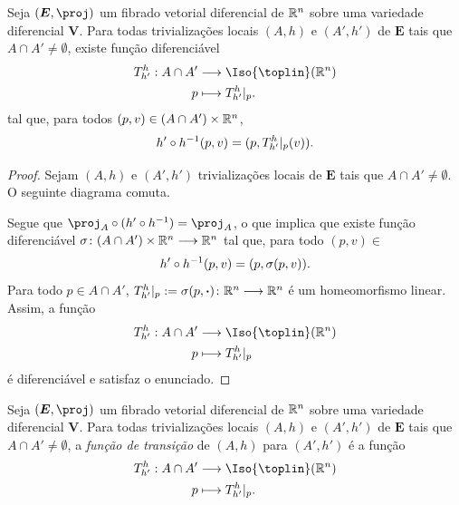 \begin{prop}
Seja $(\bm E,\proj)$ um fibrado vetorial diferencial de $\mathbb{R}^n$ sobre uma variedade diferencial $\bm V$. Para todas trivializações locais $(A,h)$ e $(A',h')$ de $\bm E$ tais que $A \cap A' \neq \emptyset$, existe função diferenciável
	\begin{align*}
	\func{T^h_{h'}}{A \cap A'}{\Iso{\toplin}(\R^n)}{p}{T^h_{h'}|_p}.
	\end{align*}
tal que, para todos $(p,v) \in (A \cap A') \times \mathbb{R}^n$,
	\begin{equation*}
	h' \circ h^{-1}(p,v) = (p,T^h_{h'}|_p (v)).
	\end{equation*}
\end{prop}
\begin{proof}
Sejam $(A,h)$ e $(A',h')$ trivializações locais de $\bm E$ tais que $A \cap A' \neq \emptyset$. O seguinte diagrama comuta.
\begin{figure}
\centering
{}
\end{figure}

Segue que $\proj_A \circ (h' \circ h\inv) = \proj_A$, o que implica que existe função diferenciável $\sigma\colon (A \cap A') \times \mathbb{R}^n \longrightarrow \mathbb{R}^n$ tal que, para todo $(p,v) \in $
	\begin{equation*}
	h' \circ h^{-1}(p,v) = (p,\sigma(p,v)).
	\end{equation*}
Para todo $p \in A \cap A'$, $T^h_{h'}|_p := \sigma(p,\bm{\cdot})\colon \mathbb{R}^n \longrightarrow \mathbb{R}^n$ é um homeomorfismo linear. Assim, a função
	\begin{align*}
	\func{T^h_{h'}}{A \cap A'}{\Iso{\toplin}(\R^n)}{p}{T^h_{h'}|_p}
	\end{align*}
é diferenciável e satisfaz o enunciado.
\end{proof}

\begin{defi}
Seja $(\bm E,\proj)$ um fibrado vetorial diferencial de $\mathbb{R}^n$ sobre uma variedade diferencial $\bm V$. Para todas trivializações locais $(A,h)$ e $(A',h')$ de $\bm E$ tais que $A \cap A' \neq \emptyset$, a \emph{função de transição} de $(A,h)$ para $(A',h')$ é a função
	\begin{align*}
	\func{T^h_{h'}}{A \cap A'}{\Iso{\toplin}(\R^n)}{p}{T^h_{h'}|_p}.
	\end{align*}
\end{defi}

